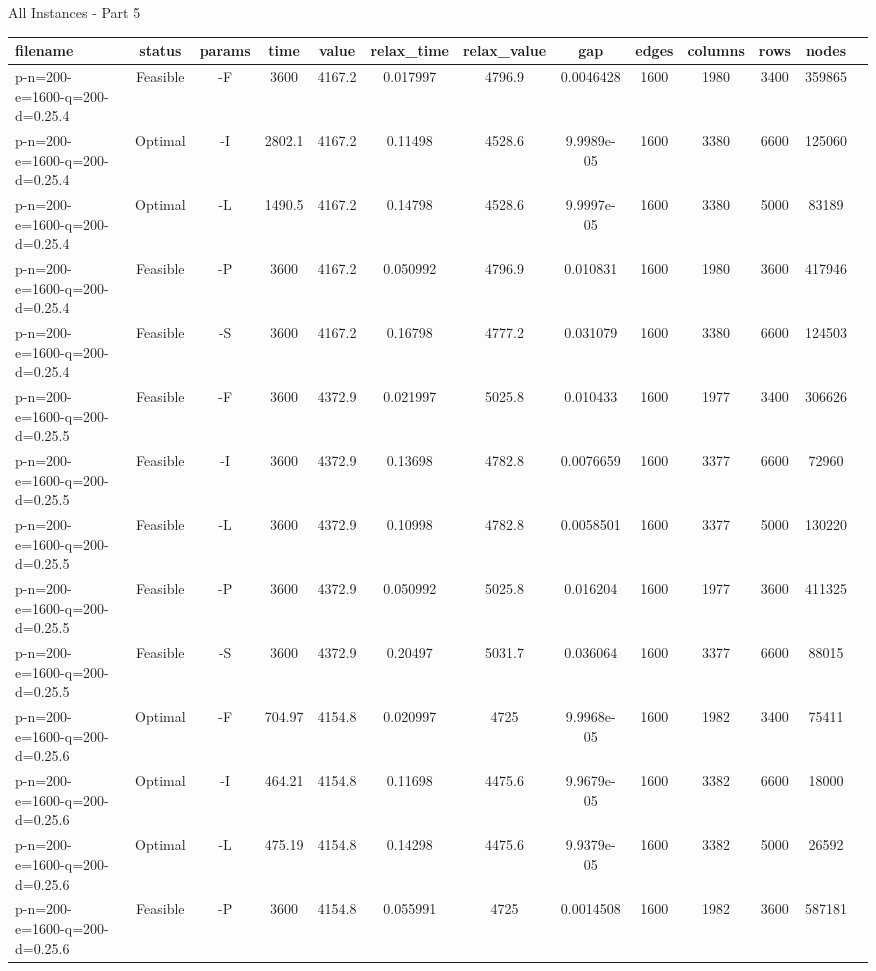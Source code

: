 \documentclass[landscape, a4paper]{article}
\begin{document}
\begin{center}
All Instances - Part 5

\begin{tabular}{lcccccccccccc}
filename & status & params & time & value & relax\_time & relax\_value & gap & edges & columns & rows & nodes & \\
\hline
p-n=200-e=1600-q=200-d=0.25.4 & Feasible & -F & 3600 & 4167.2 & 0.017997 & 4796.9 & 0.0046428 & 1600 & 1980 & 3400 & 359865 & \\
p-n=200-e=1600-q=200-d=0.25.4 & Optimal & -I & 2802.1 & 4167.2 & 0.11498 & 4528.6 & 9.9989e-05 & 1600 & 3380 & 6600 & 125060 & \\
p-n=200-e=1600-q=200-d=0.25.4 & Optimal & -L & 1490.5 & 4167.2 & 0.14798 & 4528.6 & 9.9997e-05 & 1600 & 3380 & 5000 & 83189 & \\
p-n=200-e=1600-q=200-d=0.25.4 & Feasible & -P & 3600 & 4167.2 & 0.050992 & 4796.9 & 0.010831 & 1600 & 1980 & 3600 & 417946 & \\
p-n=200-e=1600-q=200-d=0.25.4 & Feasible & -S & 3600 & 4167.2 & 0.16798 & 4777.2 & 0.031079 & 1600 & 3380 & 6600 & 124503 & \\
p-n=200-e=1600-q=200-d=0.25.5 & Feasible & -F & 3600 & 4372.9 & 0.021997 & 5025.8 & 0.010433 & 1600 & 1977 & 3400 & 306626 & \\
p-n=200-e=1600-q=200-d=0.25.5 & Feasible & -I & 3600 & 4372.9 & 0.13698 & 4782.8 & 0.0076659 & 1600 & 3377 & 6600 & 72960 & \\
p-n=200-e=1600-q=200-d=0.25.5 & Feasible & -L & 3600 & 4372.9 & 0.10998 & 4782.8 & 0.0058501 & 1600 & 3377 & 5000 & 130220 & \\
p-n=200-e=1600-q=200-d=0.25.5 & Feasible & -P & 3600 & 4372.9 & 0.050992 & 5025.8 & 0.016204 & 1600 & 1977 & 3600 & 411325 & \\
p-n=200-e=1600-q=200-d=0.25.5 & Feasible & -S & 3600 & 4372.9 & 0.20497 & 5031.7 & 0.036064 & 1600 & 3377 & 6600 & 88015 & \\
p-n=200-e=1600-q=200-d=0.25.6 & Optimal & -F & 704.97 & 4154.8 & 0.020997 & 4725 & 9.9968e-05 & 1600 & 1982 & 3400 & 75411 & \\
p-n=200-e=1600-q=200-d=0.25.6 & Optimal & -I & 464.21 & 4154.8 & 0.11698 & 4475.6 & 9.9679e-05 & 1600 & 3382 & 6600 & 18000 & \\
p-n=200-e=1600-q=200-d=0.25.6 & Optimal & -L & 475.19 & 4154.8 & 0.14298 & 4475.6 & 9.9379e-05 & 1600 & 3382 & 5000 & 26592 & \\
p-n=200-e=1600-q=200-d=0.25.6 & Feasible & -P & 3600 & 4154.8 & 0.055991 & 4725 & 0.0014508 & 1600 & 1982 & 3600 & 587181 & \\

\end{tabular}
\end{center}
\end{document}
